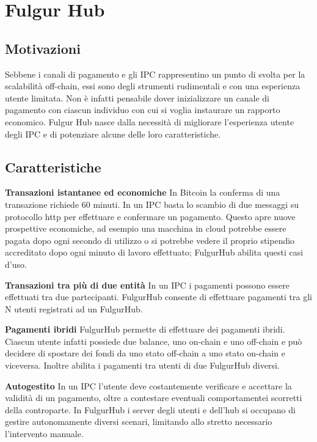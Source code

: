 \documentclass[12pt,italian,]{book}
\begin{document}
\hypertarget{fulgur-hub}{%
\section{Fulgur Hub}\label{fulgur-hub}}

\hypertarget{motivazioni}{%
\subsection{Motivazioni}\label{motivazioni}}

Sebbene i canali di pagamento e gli IPC rappresentino un punto di svolta per la scalabilità off-chain, essi sono degli strumenti rudimentali e con una esperienza utente limitata. Non è infatti pensabile dover inizializzare un canale di pagamento con ciascun individuo con cui si voglia instaurare un rapporto economico. Fulgur Hub nasce dalla necessità di migliorare l'esperienza utente degli IPC e di potenziare alcune delle loro caratteristiche.

\hypertarget{caratteristiche}{%
\subsection{Caratteristiche}\label{caratteristiche}}

\textbf{\textbf{Transazioni istantanee ed economiche}} In Bitcoin la conferma di una transazione richiede 60 minuti. In un IPC basta lo scambio di due messaggi su protocollo http per effettuare e confermare un pagamento. Questo apre nuove prospettive economiche, ad esempio una macchina in cloud potrebbe essere pagata dopo ogni secondo di utilizzo o si potrebbe vedere il proprio stipendio accreditato dopo ogni minuto di lavoro effettuato; FulgurHub abilita questi casi d'uso.

\textbf{\textbf{Transazioni tra più di due entità}} In un IPC i pagamenti possono essere effettuati tra due partecipanti. FulgurHub consente di effettuare pagamenti tra gli N utenti registrati ad un FulgurHub.

\textbf{\textbf{Pagamenti ibridi}} FulgurHub permette di effettuare dei pagamenti ibridi. Ciascun utente infatti possiede due balance, uno on-chain e uno off-chain e può decidere di spostare dei fondi da uno stato off-chain a uno stato on-chain e viceversa. Inoltre abilita i pagamenti tra utenti di due FulgurHub diversi.

\textbf{\textbf{Autogestito}} In un IPC l'utente deve costantemente verificare e accettare la validità di un pagamento, oltre a contestare eventuali comportamentei scorretti della controparte. In FulgurHub i server degli utenti e dell'hub si occupano di gestire autonomamente diversi scenari, limitando allo stretto necessario l'intervento manuale.
\end{document}
